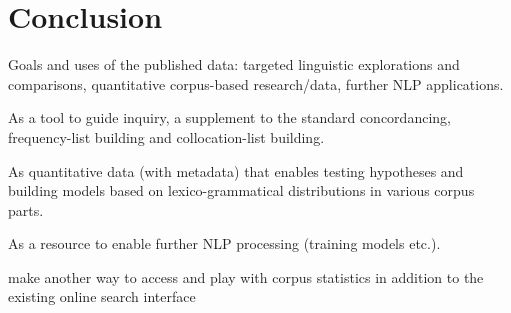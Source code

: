 \documentclass[12pt]{article}
\begin{document}
\section{Conclusion}

Goals and uses of the published data: targeted linguistic explorations
and comparisons, quantitative corpus-based research/data, further NLP
applications. 

As a tool to guide inquiry, a supplement to the standard
concordancing, frequency-list building and collocation-list building.

As quantitative data (with metadata) that enables testing hypotheses
and building models based on lexico-grammatical distributions in
various corpus parts. 

As a resource to enable further NLP processing (training models
etc.).

make another way to access and play with corpus statistics in addition
to the existing online search interface
\end{document}
